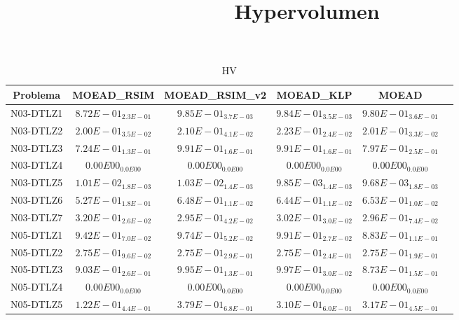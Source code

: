 \documentclass{article}
\title{Hypervolumen}
\author{}
\begin{document}
\maketitle
\begin{table*}[ht!]
\scriptsize
\caption{HV}
\centering\begin{tabular}{|c||c||c||c||c||c|} \hline
Problema &MOEAD_RSIM &MOEAD_RSIM_v2 &MOEAD_KLP &MOEAD\\\hline
N03-DTLZ1 &$8.72E-01_{2.3E-01}$ &\cellcolor{gray95}$9.85E-01_{3.7E-03}$ &\cellcolor{gray25}$9.84E-01_{3.5E-03}$ &$9.80E-01_{3.6E-01}$\\ 
\hline
N03-DTLZ2 &$2.00E-01_{3.5E-02}$ &\cellcolor{gray25}$2.10E-01_{4.1E-02}$ &\cellcolor{gray95}$2.23E-01_{2.4E-02}$ &$2.01E-01_{3.3E-02}$\\ 
\hline
N03-DTLZ3 &$7.24E-01_{1.3E-01}$ &\cellcolor{gray95}$9.91E-01_{1.6E-01}$ &\cellcolor{gray25}$9.91E-01_{1.6E-01}$ &$7.97E-01_{2.5E-01}$\\ 
\hline
N03-DTLZ4 &\cellcolor{gray95}$0.00E00_{0.0E00}$ &\cellcolor{gray25}$0.00E00_{0.0E00}$ &$0.00E00_{0.0E00}$ &$0.00E00_{0.0E00}$\\ 
\hline
N03-DTLZ5 &\cellcolor{gray25}$1.01E-02_{1.8E-03}$ &\cellcolor{gray95}$1.03E-02_{1.4E-03}$ &$9.85E-03_{1.4E-03}$ &$9.68E-03_{1.8E-03}$\\ 
\hline
N03-DTLZ6 &$5.27E-01_{1.8E-01}$ &\cellcolor{gray25}$6.48E-01_{1.1E-02}$ &$6.44E-01_{1.1E-02}$ &\cellcolor{gray95}$6.53E-01_{1.0E-02}$\\ 
\hline
N03-DTLZ7 &\cellcolor{gray95}$3.20E-01_{2.6E-02}$ &$2.95E-01_{4.2E-02}$ &\cellcolor{gray25}$3.02E-01_{3.0E-02}$ &$2.96E-01_{7.4E-02}$\\ 
\hline
N05-DTLZ1 &$9.42E-01_{7.0E-02}$ &\cellcolor{gray25}$9.74E-01_{5.2E-02}$ &\cellcolor{gray95}$9.91E-01_{2.7E-02}$ &$8.83E-01_{1.1E-01}$\\ 
\hline
N05-DTLZ2 &\cellcolor{gray95}$2.75E-01_{9.6E-02}$ &$2.75E-01_{2.9E-01}$ &$2.75E-01_{2.4E-01}$ &\cellcolor{gray25}$2.75E-01_{1.9E-01}$\\ 
\hline
N05-DTLZ3 &$9.03E-01_{2.6E-01}$ &\cellcolor{gray25}$9.95E-01_{1.3E-01}$ &\cellcolor{gray95}$9.97E-01_{3.0E-02}$ &$8.73E-01_{1.5E-01}$\\ 
\hline
N05-DTLZ4 &\cellcolor{gray95}$0.00E00_{0.0E00}$ &\cellcolor{gray25}$0.00E00_{0.0E00}$ &$0.00E00_{0.0E00}$ &$0.00E00_{0.0E00}$\\ 
\hline
N05-DTLZ5 &$1.22E-01_{4.4E-01}$ &\cellcolor{gray95}$3.79E-01_{6.8E-01}$ &$3.10E-01_{6.0E-01}$ &\cellcolor{gray25}$3.17E-01_{4.5E-01}$\\ 

\end{tabular}
\end{table*}
\end{document}
